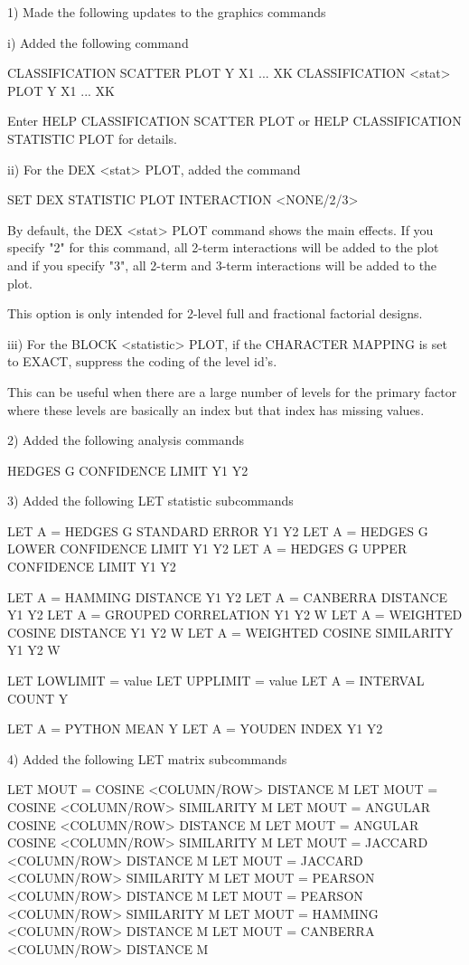  1) Made the following updates to the graphics commands

      i) Added the following command

           CLASSIFICATION SCATTER PLOT Y X1 ... XK
           CLASSIFICATION <stat> PLOT  Y X1 ... XK

         Enter HELP CLASSIFICATION SCATTER PLOT or
         HELP CLASSIFICATION STATISTIC PLOT for details.

     ii) For the DEX <stat> PLOT, added the command

            SET DEX STATISTIC PLOT INTERACTION <NONE/2/3>

         By default, the DEX <stat> PLOT command shows the main effects.
         If you specify "2" for this command, all 2-term interactions
         will be added to the plot and if you specify "3", all 2-term
         and 3-term interactions will be added to the plot.

         This option is only intended for 2-level full and fractional
         factorial designs.

    iii) For the BLOCK <statistic> PLOT, if the CHARACTER MAPPING
         is set to EXACT, suppress the coding of the level id's.

         This can be useful when there are a large number of levels
         for the primary factor where these levels are basically
         an index but that index has missing values.

 2) Added the following analysis commands

      HEDGES G CONFIDENCE LIMIT Y1 Y2

 3) Added the following LET statistic subcommands

      LET A  = HEDGES G STANDARD ERROR Y1 Y2
      LET A  = HEDGES G LOWER CONFIDENCE LIMIT Y1 Y2
      LET A  = HEDGES G UPPER CONFIDENCE LIMIT Y1 Y2

      LET A  = HAMMING DISTANCE Y1 Y2
      LET A  = CANBERRA DISTANCE Y1 Y2
      LET A  = GROUPED CORRELATION Y1 Y2 W
      LET A  = WEIGHTED COSINE DISTANCE Y1 Y2 W
      LET A  = WEIGHTED COSINE SIMILARITY Y1 Y2 W

      LET LOWLIMIT = value
      LET UPPLIMIT = value
      LET A = INTERVAL COUNT Y

      LET A = PYTHON MEAN Y
      LET A = YOUDEN INDEX Y1 Y2

 4) Added the following LET matrix subcommands

      LET MOUT = COSINE <COLUMN/ROW> DISTANCE M
      LET MOUT = COSINE <COLUMN/ROW> SIMILARITY M
      LET MOUT = ANGULAR COSINE <COLUMN/ROW> DISTANCE M
      LET MOUT = ANGULAR COSINE <COLUMN/ROW> SIMILARITY M
      LET MOUT = JACCARD <COLUMN/ROW> DISTANCE M
      LET MOUT = JACCARD <COLUMN/ROW> SIMILARITY M
      LET MOUT = PEARSON <COLUMN/ROW> DISTANCE M
      LET MOUT = PEARSON <COLUMN/ROW> SIMILARITY M
      LET MOUT = HAMMING <COLUMN/ROW> DISTANCE M
      LET MOUT = CANBERRA <COLUMN/ROW> DISTANCE M

